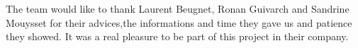 The team would like to thank Laurent Beugnet, Ronan Guivarch and Sandrine Mouysset for their advices,the informations and time they gave us and patience they showed. It was a real pleasure to be part of this project in their company.